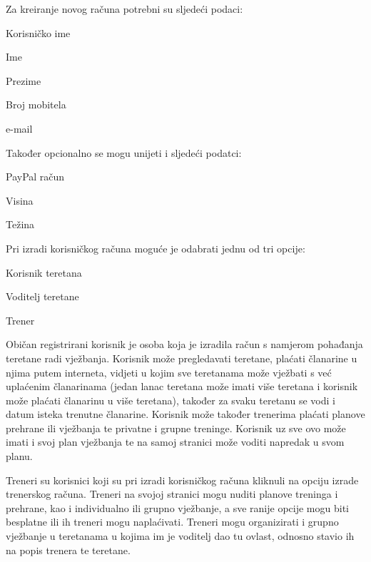 		Za kreiranje novog računa potrebni su sljedeći podaci:

		\begin{packed_item}
			\item Korisničko ime
			\item Ime
			\item Prezime
			\item Broj mobitela
			\item e-mail
		\end{packed_item}
	
		Također opcionalno se mogu unijeti i sljedeći podatci:
		
		\begin{packed_item}
			\item PayPal račun
			\item Visina
			\item Težina
		\end{packed_item}
	
		Pri izradi korisničkog računa moguće je odabrati jednu od tri opcije:
		
		\begin{packed_item}
			\item Korisnik teretana
			\item Voditelj teretane
			\item Trener
		\end{packed_item}
	
		Običan registrirani korisnik je osoba koja je izradila račun s namjerom pohađanja teretane radi vježbanja.
		Korisnik može pregledavati teretane, plaćati članarine u njima putem interneta, vidjeti u kojim sve teretanama
		može vježbati s već uplaćenim članarinama (jedan lanac teretana može imati više teretana i korisnik može
		plaćati članarinu u više teretana), također za svaku teretanu se vodi i datum isteka trenutne članarine. Korisnik
		može također trenerima plaćati planove prehrane ili vježbanja te privatne i grupne treninge. Korisnik uz sve
		ovo može imati i svoj plan vježbanja te na samoj stranici može voditi napredak u svom planu.
	
		Treneri su korisnici koji su pri izradi korisničkog računa kliknuli na opciju izrade trenerskog računa. Treneri na
		svojoj stranici mogu nuditi planove treninga i prehrane, kao i individualno ili grupno vježbanje, a sve ranije
		opcije mogu biti besplatne ili ih treneri mogu naplaćivati. Treneri mogu organizirati i grupno vježbanje u
		teretanama u kojima im je voditelj dao tu ovlast, odnosno stavio ih na popis trenera te teretane.
	
